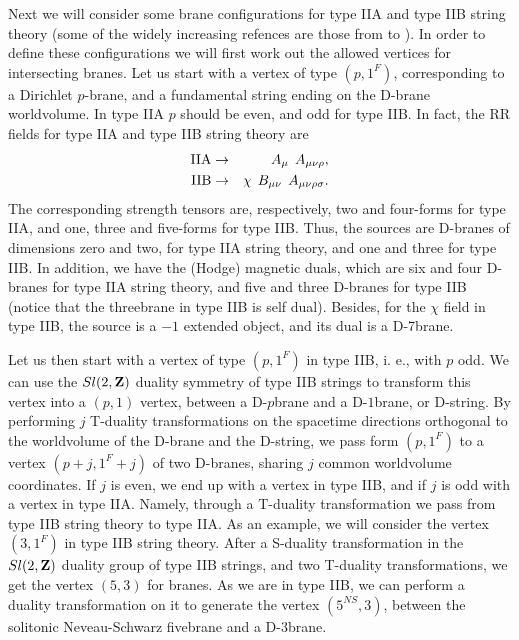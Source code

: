   
Next we will consider some brane configurations for type IIA and
type IIB string theory (some of the widely increasing refences are those 
from \cite{HW} to \cite{Wbqcd}). In order to define these configurations we will first
work out the allowed vertices for intersecting branes. Let us
start with a vertex of type $(p,1^F)$, corresponding to a
Dirichlet $p$-brane, and a fundamental string ending on the
D-brane worldvolume. In type IIA $p$ should be even, and odd for
type IIB. In fact, the RR fields for type IIA and type IIB string
theory are
\begin{eqnarray}
\hbox {IIA} & \rightarrow & A_{\mu} \: \: A_{\mu \nu \rho},
\nonumber \\
\hbox {IIB} & \rightarrow & \chi \: \: B_{\mu \nu} \: \: A_{\mu
\nu \rho \sigma}. 
\end{eqnarray}
The corresponding strength tensors are, respectively, two and
four-forms for type IIA, and one, three and five-forms for type
IIB. Thus, the sources are D-branes of dimensions zero and two,
for type IIA string theory, and one and three for type IIB. In
addition, we have the (Hodge) magnetic duals, which are six and
four D-branes for type IIA string theory, and five and three
D-branes for type IIB (notice that the threebrane in type IIB is
self dual). Besides, for the $\chi$ field in type IIB, the source
is a $-1$ extended object, and its dual is a D-7brane. 
  
Let us then start with a vertex of type $(p,1^F)$ in type IIB, i. e.,
with $p$ odd. We can use the $Sl(2,{\bf Z})$ duality symmetry of
type IIB strings to transform this vertex into a $(p,1)$ vertex,
between a D-$p$brane and a D-$1$brane, or D-string. By performing
$j$ T-duality transformations on the spacetime directions
orthogonal to the worldvolume of the D-brane and the D-string, we
pass form $(p,1^F)$ to a vertex $(p+j,1^F+j)$ of two D-branes,
sharing $j$ common worldvolume coordinates. If $j$ is even, we
end up with a vertex in type IIB, and if $j$ is odd with a vertex
in type IIA. Namely, through a T-duality transformation we pass
from type IIB string theory to type IIA. As an
example, we will consider the vertex $(3,1^F)$ in type IIB string
theory. After a S-duality transformation in the $Sl(2,{\bf Z})$
duality group of type IIB strings, and two T-duality
transformations, we get the vertex $(5,3)$ for branes. As we are
in type IIB, we can perform a duality transformation on it to
generate the vertex $(5^{NS},3)$, between the solitonic
Neveau-Schwarz fivebrane and a D-$3$brane.
  
